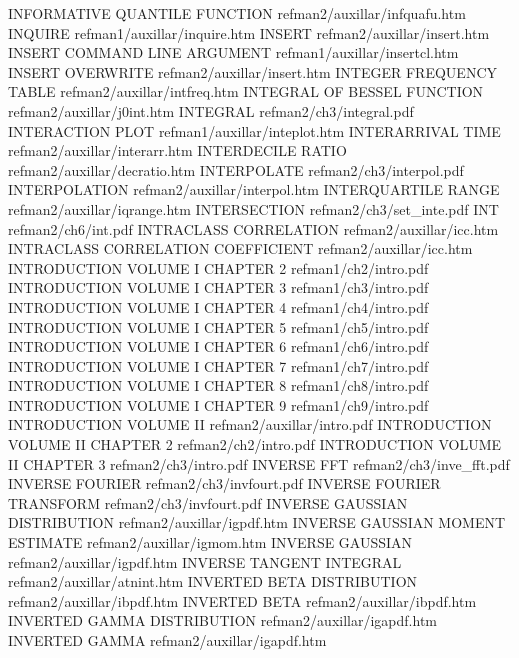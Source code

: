 INFORMATIVE QUANTILE FUNCTION           refman2/auxillar/infquafu.htm
INQUIRE                                 refman1/auxillar/inquire.htm
INSERT                                  refman2/auxillar/insert.htm
INSERT COMMAND LINE ARGUMENT            refman1/auxillar/insertcl.htm
INSERT OVERWRITE                        refman2/auxillar/insert.htm
INTEGER FREQUENCY TABLE                 refman2/auxillar/intfreq.htm
INTEGRAL OF BESSEL FUNCTION             refman2/auxillar/j0int.htm
INTEGRAL                                refman2/ch3/integral.pdf
INTERACTION PLOT                        refman1/auxillar/inteplot.htm
INTERARRIVAL TIME                       refman2/auxillar/interarr.htm
INTERDECILE RATIO                       refman2/auxillar/decratio.htm
INTERPOLATE                             refman2/ch3/interpol.pdf
INTERPOLATION                           refman2/auxillar/interpol.htm
INTERQUARTILE RANGE                     refman2/auxillar/iqrange.htm
INTERSECTION                            refman2/ch3/set_inte.pdf
INT                                     refman2/ch6/int.pdf
INTRACLASS CORRELATION                  refman2/auxillar/icc.htm
INTRACLASS CORRELATION COEFFICIENT      refman2/auxillar/icc.htm
INTRODUCTION VOLUME I CHAPTER 2         refman1/ch2/intro.pdf
INTRODUCTION VOLUME I CHAPTER 3         refman1/ch3/intro.pdf
INTRODUCTION VOLUME I CHAPTER 4         refman1/ch4/intro.pdf
INTRODUCTION VOLUME I CHAPTER 5         refman1/ch5/intro.pdf
INTRODUCTION VOLUME I CHAPTER 6         refman1/ch6/intro.pdf
INTRODUCTION VOLUME I CHAPTER 7         refman1/ch7/intro.pdf
INTRODUCTION VOLUME I CHAPTER 8         refman1/ch8/intro.pdf
INTRODUCTION VOLUME I CHAPTER 9         refman1/ch9/intro.pdf
INTRODUCTION VOLUME II                  refman2/auxillar/intro.pdf
INTRODUCTION VOLUME II CHAPTER 2        refman2/ch2/intro.pdf
INTRODUCTION VOLUME II CHAPTER 3        refman2/ch3/intro.pdf
INVERSE FFT                             refman2/ch3/inve_fft.pdf
INVERSE FOURIER                         refman2/ch3/invfourt.pdf
INVERSE FOURIER TRANSFORM               refman2/ch3/invfourt.pdf
INVERSE GAUSSIAN DISTRIBUTION           refman2/auxillar/igpdf.htm
INVERSE GAUSSIAN MOMENT ESTIMATE        refman2/auxillar/igmom.htm
INVERSE GAUSSIAN                        refman2/auxillar/igpdf.htm
INVERSE TANGENT INTEGRAL                refman2/auxillar/atnint.htm
INVERTED BETA DISTRIBUTION              refman2/auxillar/ibpdf.htm
INVERTED BETA                           refman2/auxillar/ibpdf.htm
INVERTED GAMMA DISTRIBUTION             refman2/auxillar/igapdf.htm
INVERTED GAMMA                          refman2/auxillar/igapdf.htm
